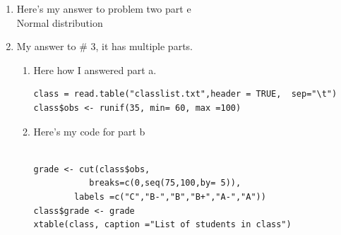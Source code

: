 \documentclass[letterpaper]{article}
\begin{document}
\begin{enumerate}
\item  Here's my answer to problem two part e
\\ Normal distribution


\item My answer to \# 3, it has multiple parts.
\begin{enumerate}
\item Here how I answered part a.
\begin{verbatim}
class = read.table("classlist.txt",header = TRUE,  sep="\t")
class$obs <- runif(35, min= 60, max =100)
\end{verbatim}


 
\item Here's my code for part b
\begin{verbatim}

grade <- cut(class$obs,
           breaks=c(0,seq(75,100,by= 5)),
        labels =c("C","B-","B","B+","A-","A"))
class$grade <- grade
xtable(class, caption ="List of students in class")
\end{verbatim}
\end{enumerate} 


\end{enumerate}
\end{document}
